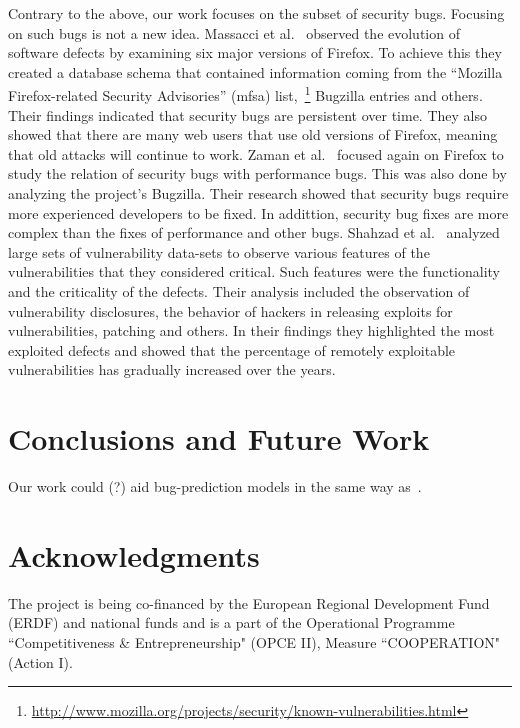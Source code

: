 \documentclass[conference]{IEEEtran}
\begin{document}
Contrary to the above, our work focuses on the subset of security bugs.
Focusing on such bugs is not a new idea. Massacci et al.~\cite{MNN11} observed
the evolution of software defects by examining six major versions of Firefox.
To achieve this they created a database schema that contained information
coming from the ``Mozilla Firefox-related Security Advisories'' ({\sc mfsa})
list,~\footnote{\url{http://www.mozilla.org/projects/security/known-vulnerabilities.html}}
Bugzilla entries and others. Their findings indicated that security bugs are
persistent over time. They also showed that there are many web users that use
old versions of Firefox, meaning that old attacks will continue to work.
Zaman et al.~\cite{ZAH11} focused again on Firefox to study the relation of
security bugs with performance bugs. This was also done by analyzing the project's
Bugzilla. Their research showed that security bugs require more experienced developers
to be fixed. In addittion, security bug fixes are more complex than the
fixes of performance and other bugs.
Shahzad et al.~\cite{SSL12} analyzed large sets of vulnerability data-sets to observe
various features of the vulnerabilities that they considered critical. Such features
were the functionality and the criticality of the defects. Their analysis
included the observation of vulnerability disclosures, the behavior of
hackers in releasing exploits for vulnerabilities, patching and others. In
their findings they highlighted the most exploited defects and showed that
the percentage of remotely exploitable vulnerabilities has gradually increased
over the years.

\section{Conclusions and Future Work}
\label{sec:con}

Our work could (?) aid bug-prediction models in the same way as~\cite{BN11}.

\section*{Acknowledgments}

The project is being co-financed by the European Regional Development Fund (ERDF)
and national funds and is a part of the Operational Programme ``Competitiveness \&
Entrepreneurship" (OPCE II), Measure ``COOPERATION" (Action I).


 
\end{document}
